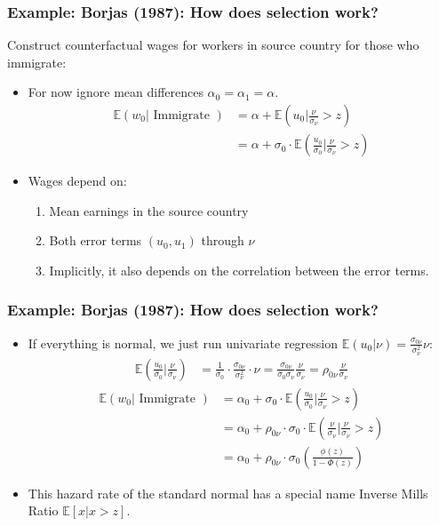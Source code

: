 \documentclass[aspectratio=169,11pt]{beamer}
\begin{document}
\begin{frame}
\frametitle{Example: Borjas (1987): How does selection work?}
Construct \alert{counterfactual wages} for workers in \alert{source} country for those who immigrate:
\begin{itemize}
\item For now ignore mean differences $\alpha_0 = \alpha_1 = \alpha$.
\begin{align*}
\mathbb{E} \left(w_{0} | \text { Immigrate }\right) &=\alpha+\mathbb{E}\left(u_{0} | \frac{\nu}{\sigma_{\nu}}>z\right) \\
&=\alpha+\sigma_{0} \cdot \mathbb{E}\left(\frac{u_{0}}{\sigma_{0}} | \frac{\nu}{\sigma_{\nu}}>z\right)
\end{align*}
\item Wages depend on:
\begin{enumerate}
\item Mean earnings in the source country
\item Both error terms $\left(u_{0}, u_{1}\right)$ through $\nu$
\item Implicitly, it also depends on the correlation between the error terms.
\end{enumerate}
\end{itemize}
\end{frame}


\begin{frame}
\frametitle{Example: Borjas (1987): How does selection work?}
\begin{itemize}
\item If everything is normal, we just run univariate regression $\mathbb{E}\left(u_{0} | \nu\right)=\frac{\sigma_{0 \nu}}{\sigma_{\nu}^{2}} \nu$:
\begin{align*}
\mathbb{E}\left(\frac{u_{0}}{\sigma_{0}} | \frac{\nu}{\sigma_{\nu}}\right) &= \frac{1}{\sigma_{0}}\cdot \frac{\sigma_{0 \nu}}{\sigma_{\nu}^{2}} \cdot \nu  
=\frac{\sigma_{0 \nu}}{\sigma_{0} \sigma_{\nu}} \frac{\nu}{\sigma_{\nu}}  =\rho_{0 \nu} \frac{\nu}{\sigma_{\nu}} 
\end{align*}
\begin{align*}
\mathbb{E}\left(w_{0} | \text { Immigrate }\right) 
&=\alpha_{0}+\sigma_{0} \cdot \mathbb{E}\left(\frac{u_{0}}{\sigma_{0}} | \frac{\nu}{\sigma_{\nu}}>z\right) \\
 &=\alpha_{0}+\rho_{0 \nu} \cdot \sigma_{0} \cdot \mathbb{E}\left(\frac{\nu}{\sigma_{\nu}} | \frac{\nu}{\sigma_{\nu}}>z\right) \\
  &=\alpha_{0}+\rho_{0 \nu} \cdot \sigma_{0}\left(\frac{\phi(z)}{1-\Phi(z)}\right) 
\end{align*}
\item This hazard rate of the standard normal has a special name \alert{Inverse Mills Ratio} $\mathbb{E}[x | x > z]$.
\end{itemize}
\end{frame}
\end{document}
